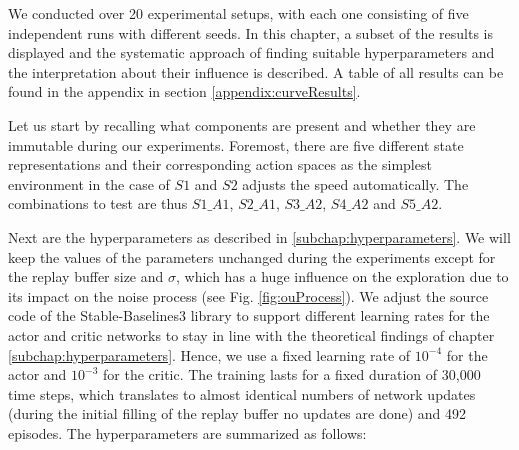 We conducted over 20 experimental setups, with each one consisting of five independent runs with different seeds. In this chapter, a subset of the results is displayed and the systematic approach of finding suitable hyperparameters and the interpretation about their influence is described. A table of all results can be found in the appendix in section \ref{appendix:curveResults}.
\par
Let us start by recalling what components are present and whether they are immutable during our experiments. Foremost, there are five different state representations and their corresponding action spaces as the simplest environment in the case of $S1$ and $S2$ adjusts the speed automatically. The combinations to test are thus $S1\_A1$, $S2\_A1$, $S3\_A2$, $S4\_A2$ and $S5\_A2$.
\par
Next are the hyperparameters as described in \ref{subchap:hyperparameters}. We will keep the values of the parameters unchanged during the experiments except for the replay buffer size and $\sigma$, which has a huge influence on the exploration due to its impact on the noise process (see Fig. \ref{fig:ouProcess}). We adjust the source code of the Stable-Baselines3 library to support different learning rates for the actor and critic networks to stay in line with the theoretical findings of chapter \ref{subchap:hyperparameters}. Hence, we use a fixed learning rate of $10^{-4}$ for the actor and  $10^{-3}$ for the critic. The training lasts for a fixed duration of 30,000 time steps, which translates to almost identical numbers of network updates (during the initial filling of the replay buffer no updates are done) and 492 episodes. The hyperparameters are summarized as follows:


